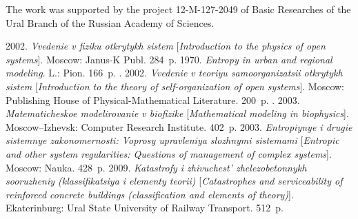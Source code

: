 

\Ack 
 The work was supported by the project 12-M-127-2049 of Basic 
Researches of the Ural Branch of the Russian Academy of Sciences. 

\vspace*{9pt}

  \begin{multicols}{2}

\renewcommand{\bibname}{\protect\rmfamily References}

{\small\frenchspacing
{%
\begin{thebibliography}{99}
  
 2002. \textit{Vvedenie v fiziku otkrytykh sistem}
[\textit{Introduction to the physics of open systems}].
Moscow: Janus-K Publ. 284~p.
 1970. \textit{Entropy in urban and regional modeling}.  
L.: Pion. 166~p.
. 2002. 
\textit{Vvedenie v teoriyu samoorganizatsii otkrytykh sistem}
[\textit{Introduction to the theory of self-organization of open systems}]. Moscow: 
Publishing House of Physical-Mathematical Literature. 200~p.
.  2003. 
\textit{Matematicheskoe modelirovanie v biofizike}
[\textit{Mathematical modeling in biophysics}]. Moscow--Izhevsk: Computer Research Institute.
402~p.
 2003. \textit{Entropiynye i drugie sistemnye 
zakonomernosti: Voprosy upravleniya slozhnymi sistemami}
[\textit{Entropic and other system regularities: Questions of management of complex
systems}]. Moscow: Nauka. 428~p.
 2009. \textit{Katastrofy i zhivuchest' 
zhelezobetonnykh sooruzheniy (klassifikatsiya i elementy teorii)}
[\textit{Catastrophes and serviceability of reinforced concrete buildings (classification and
elements of theory)}]. Ekaterinburg: 
Ural State University of Railway Transport. 512~p.


\end{thebibliography}}}
\end{multicols}
